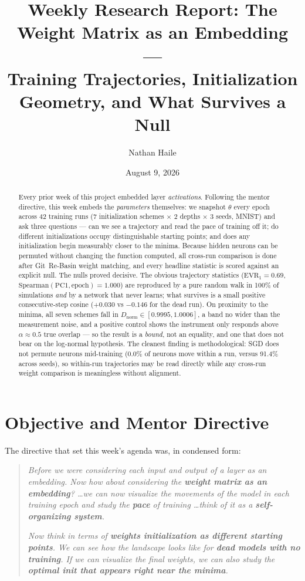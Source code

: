 \documentclass[11pt]{article}
\title{\textbf{Weekly Research Report: The Weight Matrix as an Embedding ---\\
Training Trajectories, Initialization Geometry, and What Survives a Null}}
\author{Nathan Haile}
\date{August 9, 2026}
\begin{document}
\maketitle

\begin{abstract}
Every prior week of this project embedded layer \emph{activations}. Following the mentor
directive, this week embeds the \emph{parameters} themselves: we snapshot $\theta$ every epoch
across 42 training runs (7 initialization schemes $\times$ 2 depths $\times$ 3 seeds, MNIST) and
ask three questions --- can we see a trajectory and read the pace of training off it; do
different initializations occupy distinguishable starting points; and does any initialization
begin measurably closer to the minima. Because hidden neurons can be permuted without changing
the function computed, all cross-run comparison is done after Git~Re-Basin weight matching, and
every headline statistic is scored against an explicit null. The nulls proved decisive. The
obvious trajectory statistics ($\mathrm{EVR}_1=0.69$, $\mathrm{Spearman}(\mathrm{PC1},
\mathrm{epoch})=1.000$) are reproduced by a pure random walk in 100\% of simulations \emph{and}
by a network that never learns; what survives is a small positive consecutive-step cosine
($+0.030$ vs $-0.146$ for the dead run). On proximity to the minima, all seven schemes fall in
$D_{\text{norm}}\in[0.9995,1.0006]$, a band no wider than the measurement noise, and a positive
control shows the instrument only responds above $\alpha\approx0.5$ true overlap --- so the
result is a \emph{bound}, not an equality, and one that does not bear on the log-normal
hypothesis. The cleanest finding is methodological: SGD does not permute neurons mid-training
(0.0\% of neurons move within a run, versus 91.4\% across seeds), so within-run trajectories may
be read directly while any cross-run weight comparison is meaningless without alignment.
\end{abstract}

\section{Objective and Mentor Directive}

The directive that set this week's agenda was, in condensed form:

\begin{quote}
\emph{Before we were considering each input and output of a layer as an embedding. Now how about
considering the \textbf{weight matrix as an embedding}? \dots we can now visualize the movements
of the model in each training epoch and study the \textbf{pace} of training \dots think of it as a
\textbf{self-organizing system}.}

\emph{Now think in terms of \textbf{weights initialization as different starting points}. We can
see how the landscape looks like for \textbf{dead models with no training}. If we can visualize
the final weights, we can also study the \textbf{optimal init that appears right near the
minima}.}
\end{quote}
\end{document}
